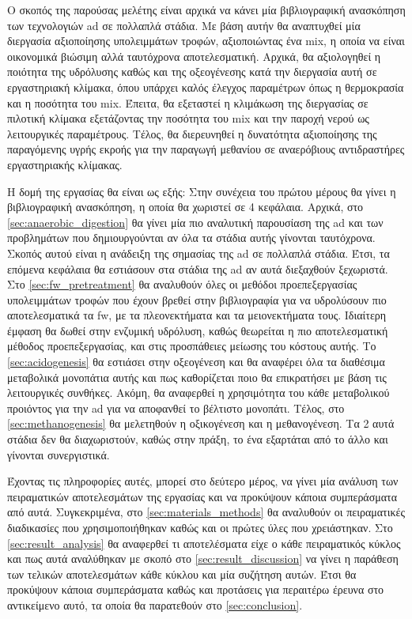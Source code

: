 \documentclass[11pt]{report}
\begin{document}
Ο σκοπός της παρούσας μελέτης είναι αρχικά να κάνει μία βιβλιογραφική ανασκόπηση των τεχνολογιών \acrshort{ad} σε πολλαπλά στάδια. Με βάση αυτήν θα αναπτυχθεί μία διεργασία αξιοποίησης υπολειμμάτων τροφών, αξιοποιώντας ένα \acrfull{mix}, η οποία να είναι οικονομικά βιώσιμη αλλά ταυτόχρονα αποτελεσματική. Αρχικά, θα αξιολογηθεί η ποιότητα της υδρόλυσης καθώς και της οξεογένεσης κατά την διεργασία αυτή σε εργαστηριακή κλίμακα, όπου υπάρχει καλός έλεγχος παραμέτρων όπως η θερμοκρασία και η ποσότητα του \acrshort{mix}. Έπειτα, θα εξεταστεί η κλιμάκωση της διεργασίας σε πιλοτική κλίμακα εξετάζοντας την ποσότητα του \acrshort{mix} και την παροχή νερού ως λειτουργικές παραμέτρους. Τέλος, θα διερευνηθεί η δυνατότητα αξιοποίησης της παραγόμενης υγρής εκροής για την παραγωγή μεθανίου σε αναερόβιους αντιδραστήρες εργαστηριακής κλίμακας.

Η δομή της εργασίας θα είναι ως εξής: Στην συνέχεια του πρώτου μέρους θα γίνει η βιβλιογραφική ανασκόπηση, η οποία θα χωριστεί σε 4 κεφάλαια. Αρχικά, στο \autoref{sec:anaerobic_digestion} θα γίνει μία πιο αναλυτική παρουσίαση της \acrshort{ad} και των προβλημάτων που δημιουργούνται αν όλα τα στάδια αυτής γίνονται ταυτόχρονα. Σκοπός αυτού είναι η ανάδειξη της σημασίας της \acrshort{ad} σε πολλαπλά στάδια. Έτσι, τα επόμενα κεφάλαια θα εστιάσουν στα στάδια της \acrshort{ad} αν αυτά διεξαχθούν ξεχωριστά. Στο \autoref{sec:fw_pretreatment} θα αναλυθούν όλες οι μεθόδοι προεπεξεργασίας υπολειμμάτων τροφών που έχουν βρεθεί στην βιβλιογραφία για να υδρολύσουν πιο αποτελεσματικά τα \acrshort{fw}, με τα πλεονεκτήματα και τα μειονεκτήματα τους. Ιδιαίτερη έμφαση θα δωθεί στην ενζυμική υδρόλυση, καθώς θεωρείται η πιο αποτελεσματική μέθοδος προεπεξεργασίας, και στις προσπάθειες μείωσης του κόστους αυτής. Το \autoref{sec:acidogenesis} θα εστιάσει στην οξεογένεση και θα αναφέρει όλα τα διαθέσιμα μεταβολικά μονοπάτια αυτής και πως καθορίζεται ποιο θα επικρατήσει με βάση τις λειτουργικές συνθήκες. Ακόμη, θα αναφερθεί η χρησιμότητα του κάθε μεταβολικού προιόντος για την \acrshort{ad} για να αποφανθεί το βέλτιστο μονοπάτι. Τέλος, στο \autoref{sec:methanogenesis} θα μελετηθούν η οξικογένεση και η μεθανογένεση. Τα 2 αυτά στάδια δεν θα διαχωριστούν, καθώς στην πράξη, το ένα εξαρτάται από το άλλο και γίνονται συνεργιστικά.

Έχοντας τις πληροφορίες αυτές, μπορεί στο δεύτερο μέρος, να γίνει μία ανάλυση των πειραματικών αποτελεσμάτων της εργασίας και να προκύψουν κάποια συμπεράσματα από αυτά. Συγκεκριμένα, στο \autoref{sec:materials_methods} θα αναλυθούν οι πειραματικές διαδικασίες που χρησιμοποιήθηκαν καθώς και οι πρώτες ύλες που χρειάστηκαν. Στο \autoref{sec:result_analysis} θα αναφερθεί τι αποτελέσματα είχε ο κάθε πειραματικός κύκλος και πως αυτά αναλύθηκαν με σκοπό στο \autoref{sec:result_discussion} να γίνει η παράθεση των τελικών αποτελεσμάτων κάθε κύκλου και μία συζήτηση αυτών. Έτσι θα προκύψουν κάποια συμπεράσματα καθώς και προτάσεις για περαιτέρω έρευνα στο αντικείμενο αυτό, τα οποία θα παρατεθούν στο \autoref{sec:conclusion}.
\end{document}
